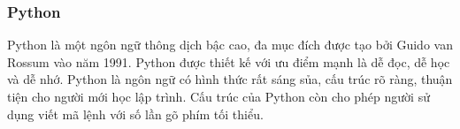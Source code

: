 \subsubsection{Python}

\begin{center}
  \captionsetup{type=figure}
  
\end{center}

Python là một ngôn ngữ thông dịch bậc cao, đa mục đích được tạo bởi Guido van Rossum vào năm 1991. Python được thiết kế với ưu điểm mạnh là dễ đọc, dễ học và dễ nhớ. Python là ngôn ngữ có hình thức rất sáng sủa, cấu trúc rõ ràng, thuận tiện cho người mới học lập trình. Cấu trúc của Python còn cho phép người sử dụng viết mã lệnh với số lần gõ phím tối thiểu.
